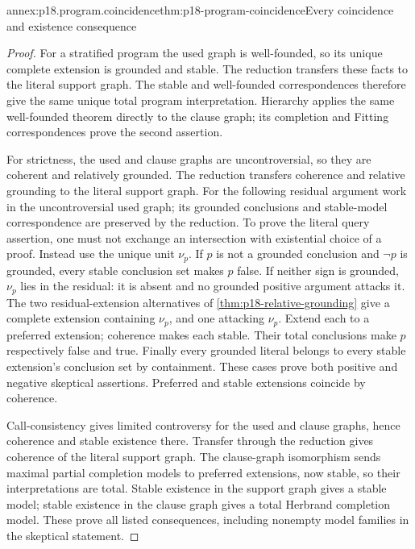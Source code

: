 \begin{annexitem}{annex:p18.program.coincidence}{thm:p18-program-coincidence}{Every coincidence and existence consequence}
\begin{proof}
For a stratified program the used graph is
well-founded, so its unique complete extension
is grounded and stable. The reduction transfers
these facts to the literal support graph.
The stable and well-founded correspondences
therefore give the same unique total program
interpretation. Hierarchy applies the same
well-founded theorem directly to the clause
graph; its completion and Fitting
correspondences prove the second assertion.

For strictness, the used and clause graphs
are uncontroversial, so they are coherent
and relatively grounded. The reduction
transfers coherence and relative grounding
to the literal support graph.
For the following residual argument work
in the uncontroversial used graph; its
grounded conclusions and stable-model
correspondence are preserved by the reduction.
To prove the literal query assertion,
one must not exchange an intersection
with existential choice of a proof.
Instead use the unique unit \(\nu_p\).
If \(p\) is not a grounded conclusion
and \(\neg p\) is grounded, every stable
conclusion set makes \(p\) false.
If neither sign is grounded, \(\nu_p\)
lies in the residual: it is absent
and no grounded positive argument
attacks it. The two residual-extension
alternatives of
\cref{thm:p18-relative-grounding}
give a complete extension containing
\(\nu_p\), and one attacking \(\nu_p\).
Extend each to a preferred extension;
coherence makes each stable. Their
total conclusions make \(p\) respectively
false and true. Finally every grounded
literal belongs to every stable
extension's conclusion set by containment.
These cases prove both positive and
negative skeptical assertions. Preferred
and stable extensions coincide by coherence.

Call-consistency gives limited controversy
for the used and clause graphs, hence
coherence and stable existence there.
Transfer through the reduction gives
coherence of the literal support graph.
The clause-graph isomorphism sends
maximal partial completion models to
preferred extensions, now stable, so
their interpretations are total.
Stable existence in the support graph
gives a stable model; stable existence
in the clause graph gives a total
Herbrand completion model. These prove
all listed consequences, including
nonempty model families in the
skeptical statement.
\end{proof}
\end{annexitem}

